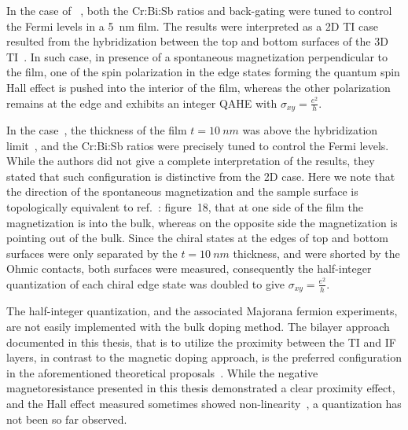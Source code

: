 In the case of \citeauthor{Chang2013}~\cite{Chang2013}, both the Cr:Bi:Sb ratios and back-gating were tuned to control the Fermi levels in a \SI{5}{nm} film. The results were interpreted as a 2D TI case resulted from the hybridization between the top and bottom surfaces of the 3D TI~\cite{QAH_TI_Yu, 2d_crossover}. In such case, in presence of a spontaneous magnetization perpendicular to the film, one of the spin polarization in the edge states forming the quantum spin Hall effect is pushed into the interior of the film, whereas the other polarization remains at the edge and exhibits an integer QAHE with $\sigma_{xy} = \frac{e^2}{h}$.

In the \citeauthor{Chang2013} case~\cite{Chang2013}, the thickness of the film $t=\SI{10}{nm}$ was above the hybridization limit~\cite{ARPES_thickness}, and the Cr:Bi:Sb ratios were precisely tuned to control the Fermi levels. While the authors did not give a complete interpretation of the results, they stated that such configuration is distinctive from the 2D case. Here we note that the direction of the spontaneous magnetization and the sample surface is topologically equivalent to ref.~\cite{TI_Col}: figure~18, that at one side of the film the magnetization is into the bulk, whereas on the opposite side the magnetization is pointing out of the bulk. Since the chiral states at the edges of top and bottom surfaces were only separated by the $t=\SI{10}{nm}$ thickness, and were shorted by the Ohmic contacts, both surfaces were measured, consequently the half-integer quantization of each chiral edge state was doubled to give $\sigma_{xy} = \frac{e^2}{h}$.

The half-integer quantization, and the associated Majorana fermion experiments, are not easily implemented with the bulk doping method. The bilayer approach documented in this thesis, that is to utilize the proximity between the TI and IF layers, in contrast to the magnetic doping approach, is the preferred configuration in the aforementioned theoretical proposals~\cite{TI_Col, Akhmerov2009}. While the negative magnetoresistance presented in this thesis demonstrated a clear proximity effect, and the Hall effect measured sometimes showed non-linearity~\cite{Samarth2017, Petta2014}, a quantization has not been so far observed.

